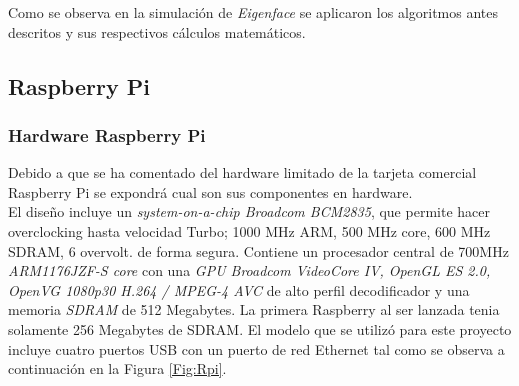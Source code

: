 \documentclass[letterpaper,12pt]{article}
\begin{document}
Como se observa  en la simulación de \emph{Eigenface} se aplicaron los algoritmos antes descritos y sus respectivos cálculos matemáticos. 
\newpage
\subsection{Raspberry Pi}
\subsubsection{Hardware Raspberry Pi}
\label{HardLim}
Debido a que se ha comentado del hardware limitado de la tarjeta comercial Raspberry Pi se expondrá cual son sus componentes en hardware.\\
El diseño incluye un \textit{system-on-a-chip Broadcom BCM2835}, que permite hacer overclocking hasta velocidad Turbo; 1000 MHz ARM, 500 MHz core, 600 MHz SDRAM, 6 overvolt. de forma segura. Contiene un procesador central de 700MHz \textit{ARM1176JZF-S core} con una \textit{GPU Broadcom VideoCore IV, OpenGL ES 2.0, OpenVG 1080p30 H.264 / MPEG-4 AVC} de alto perfil decodificador y una memoria \textit{SDRAM} de 512 Megabytes. La primera Raspberry al ser lanzada tenia solamente 256 Megabytes de SDRAM. El modelo que se utilizó para este proyecto incluye cuatro puertos USB con un puerto de red Ethernet tal como se observa a continuación en la Figura \ref{Fig:Rpi}.
\end{document}
